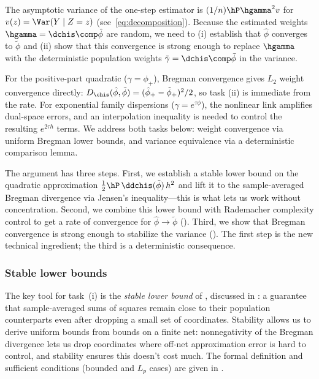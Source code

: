 \documentclass{article}
\begin{document}
The asymptotic variance of the one-step estimator is $(1/n)\hP \hgamma^2 v$ for $v(z) = \Var(Y \mid Z=z)$ (see~\eqref{eq:decomposition}). Because the estimated weights $\hgamma = \dchis \comp \hat\phi$ are random, we need to (i) establish that $\hat\phi$ converges to $\tilde\phi$ and (ii) show that this convergence is strong enough to replace $\hgamma$ with the deterministic population weights $\tilde\gamma = \dchis \comp \tilde\phi$ in the variance.

For the positive-part quadratic ($\gamma = \phi_+$), Bregman convergence gives $L_2$ weight convergence directly: $D_{\chis}(\hat\phi, \tilde\phi) = (\hat\phi_+ - \tilde\phi_+)^2/2$, so task (ii) is immediate from the rate. For exponential family dispersions ($\gamma = e^{\tau\phi}$), the nonlinear link amplifies dual-space errors, and an interpolation inequality is needed to control the resulting $e^{2\tau h}$ terms. We address both tasks below: weight convergence via uniform Bregman lower bounds, and variance equivalence via a deterministic comparison lemma.

The argument has three steps.
First, we establish a stable lower bound
on the quadratic approximation
$\frac{1}{2}\hP\, \ddchis(\tilde\phi)\, h^2$
and lift it to the sample-averaged Bregman divergence
via Jensen's inequality---this
is what lets us work
without concentration.
Second, we combine this lower bound
with Rademacher complexity control
to get a rate of convergence
for $\hat\phi \to \tilde\phi$
().
Third, we show that Bregman convergence
is strong enough to stabilize the variance
().
The first step is the new technical ingredient;
the third is a deterministic consequence.

\subsubsection{Stable lower bounds}

The key tool for task~(i) is the \emph{stable lower bound} of \citet{mendelson2021extending}, discussed in : a guarantee that sample-averaged sums of squares remain close to their population counterparts even after dropping a small set of coordinates. Stability allows us to derive uniform bounds from bounds on a finite net: nonnegativity of the Bregman divergence lets us drop coordinates where off-net approximation error is hard to control, and stability ensures this doesn't cost much. The formal definition and sufficient conditions (bounded and $L_p$ cases) are given in .
\end{document}
